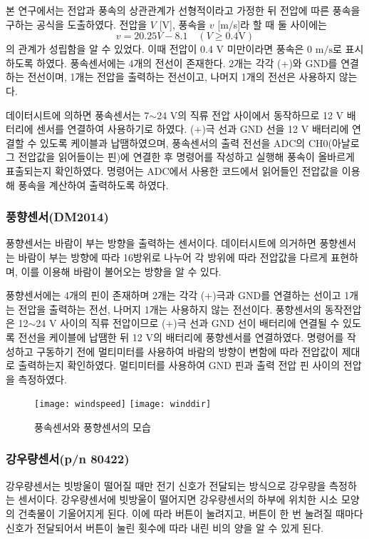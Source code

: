 본 연구에서는 전압과 풍속의 상관관계가 선형적이라고 가정한 뒤 전압에 따른 풍속을 구하는 공식을 도출하였다. 전압을 $V$ [V], 풍속을 $v$ [m/s]라 할 때 둘 사이에는
\[ v=20.25V-8.1\quad (V\geq 0.4\textrm{V})\]
의 관계가 성립함을 알 수 있었다. 이때 전압이 0.4 $\textrm{V}$ 미만이라면 풍속은 0 $\textrm{m/s}$로 표시하도록 하였다.
풍속센서에는 4개의 전선이 존재한다. 2개는 각각 (+)와 GND를 연결하는 전선이며, 1개는 전압을 출력하는 전선이고, 나머지 1개의 전선은 사용하지 않는다. 

데이터시트에 의하면 풍속센서는 7$\sim$24 $\textrm{V}$의 직류 전압 사이에서 동작하므로 12 $\textrm{V}$ 배터리에 센서를 연결하여 사용하기로 하였다. (+)극 선과 GND 선을 12 $\textrm{V}$ 배터리에 연결할 수 있도록 케이블과 납땜하였으며, 풍속센서의 출력 전선을 ADC의 CH0(아날로그 전압값을 읽어들이는 핀)에 연결한 후 명령어를 작성하고 실행해 풍속이 올바르게 표출되는지 확인하였다. 명령어는 ADC에서 사용한 코드에서 읽어들인 전압값을 이용해 풍속을 계산하여 출력하도록 하였다.

\subsubsection{풍향센서(DM2014)}
풍향센서는 바람이 부는 방향을 출력하는 센서이다. 데이터시트에 의거하면 풍향센서는 바람이 부는 방향에 따라 16방위로 나누어 각 방위에 따라 전압값을 다르게 표현하며, 이를 이용해 바람이 불어오는 방향을 알 수 있다. 

풍향센서에는 4개의 핀이 존재하며 2개는 각각 (+)극과 GND를 연결하는 선이고 1개는 전압을 출력하는 전선, 나머지 1개는 사용하지 않는 전선이다. 풍향센서의 동작전압은 12$\sim$24 $\textrm{V}$ 사이의 직류 전압이므로 (+)극 선과 GND 선이 배터리에 연결될 수 있도록 전선을 케이블에 납땜한 뒤 12 $\textrm{V}$의 배터리에 풍향센서를 연결하였다. 명령어를 작성하고 구동하기 전에 멀티미터를 사용하여 바람의 방향이 변함에 따라 전압값이 제대로 출력하는지 확인하였다. 멀티미터를 사용하여 GND 핀과 출력 전압 핀 사이의 전압을 측정하였다.

\begin{figure}[htbp]
	\centering
	\texttt{[image: windspeed]}
	\texttt{[image: winddir]}
	\caption{풍속센서와 풍향센서의 모습}
	\label{WIND}
\end{figure}

\subsubsection{강우량센서(p/n 80422)}
강우량센서는 빗방울이 떨어질 때만 전기 신호가 전달되는 방식으로 강우량을 측정하는 센서이다. 강우량센서에 빗방울이 떨어지면 강우량센서의 하부에 위치한 시소 모양의 건축물이 기울어지게 된다. 이에 따라 버튼이 눌려지고, 버튼이 한 번 눌려질 때마다 신호가 전달되어서 버튼이 눌린 횟수에 따라 내린 비의 양을 알 수 있게 된다. 

